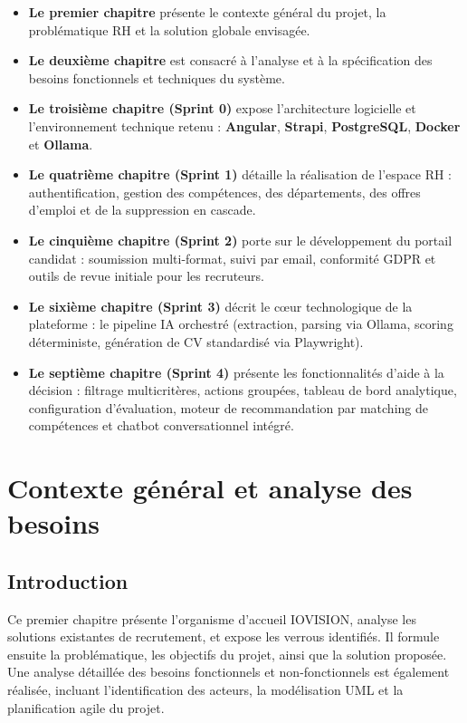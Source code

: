 \documentclass[12pt,a4paper,oneside]{report}
\begin{document}
\begin{itemize}
    \item \textbf{Le premier chapitre} présente le contexte général du 
    projet, la problématique RH et la solution globale envisagée.

    \item \textbf{Le deuxième chapitre} est consacré à l'analyse et à 
    la spécification des besoins fonctionnels et techniques du système.

    \item \textbf{Le troisième chapitre (Sprint 0)} expose l'architecture 
    logicielle et l'environnement technique retenu : \textbf{Angular}, 
    \textbf{Strapi}, \textbf{PostgreSQL}, \textbf{Docker} et 
    \textbf{Ollama}.
    \item \textbf{Le quatrième chapitre (Sprint 1)} détaille la réalisation 
    de l'espace RH : authentification, gestion des compétences, des 
    départements, des offres d'emploi et de la suppression en cascade.
     \item \textbf{Le cinquième chapitre (Sprint 2)} porte sur le développement du portail candidat : soumission multi-format, suivi 
    par email, conformité GDPR et outils de revue initiale pour les recruteurs.

    \item \textbf{Le sixième chapitre (Sprint 3)} décrit le c\oe{}ur 
    technologique de la plateforme : le pipeline IA orchestré 
    (extraction, parsing via Ollama, scoring déterministe, génération 
    de CV standardisé via Playwright).

    \item \textbf{Le septième chapitre (Sprint 4)} présente les 
    fonctionnalités d'aide à la décision : filtrage multicritères, 
    actions groupées, tableau de bord analytique, configuration 
    d'évaluation, moteur de recommandation par matching de compétences 
    et chatbot conversationnel intégré.
\end{itemize}


\chapter{Contexte général et analyse des besoins}
\pagestyle{avecEntete}
\section*{Introduction}
Ce premier chapitre présente l'organisme d'accueil IOVISION, analyse les solutions existantes de recrutement, et expose les verrous identifiés. Il formule ensuite la problématique, les objectifs du projet, ainsi que la solution proposée. Une analyse détaillée des besoins fonctionnels et non-fonctionnels est également réalisée, incluant l'identification des acteurs, la modélisation UML et la planification agile du projet.  
\end{document}
